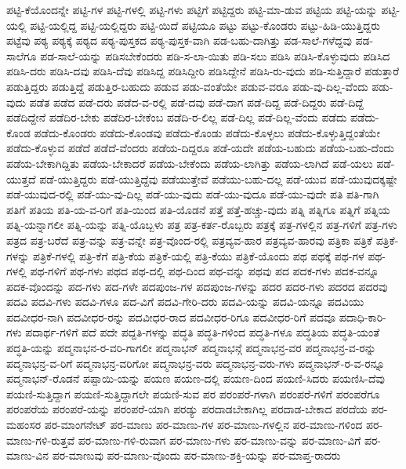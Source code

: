 {ಪಟ್ಟಿ-ಕೆಯೊಂದನ್ನೇ
ಪಟ್ಟಿ-ಗಳ
ಪಟ್ಟಿ-ಗಳಲ್ಲಿ
ಪಟ್ಟಿ-ಗಳು
ಪಟ್ಟಿಗೆ
ಪಟ್ಟಿದ್ದರು
ಪಟ್ಟಿ-ಮಾ-ಡುವ
ಪಟ್ಟಿಯ
ಪಟ್ಟಿ-ಯನ್ನು
ಪಟ್ಟಿ-ಯಲ್ಲಿ
ಪಟ್ಟಿ-ಯಲ್ಲಿದ್ದ
ಪಟ್ಟಿ-ಯಲ್ಲಿದ್ದರು
ಪಟ್ಟಿ-ಯಿದೆ
ಪಟ್ಟಿಯೂ
ಪಟ್ಟು
ಪಟ್ಟು-ಕೊಂಡರು
ಪಟ್ಟು-ಹಿಡಿ-ಯುತ್ತಿದ್ದರು
ಪಟ್ಟೆವು
ಪಠ್ಯ
ಪಠ್ಯಕ್ಕೆ
ಪಠ್ಯದ
ಪಠ್ಯ-ಪುಸ್ತಕದ
ಪಠ್ಯ-ಪುಸ್ತಕ-ವಾಗಿ
ಪಡ-ಬಹು-ದಾಗಿತ್ತು
ಪಡ-ಸಾಲೆ-ಗಳೆದ್ದವು
ಪಡ-ಸಾಲೆಗೂ
ಪಡ-ಸಾಲೆ-ಯನ್ನು
ಪಡಿಸಬೇಕೆಂದರು
ಪಡಿ-ಸ-ಲಾ-ಯಿತು
ಪಡಿ-ಸಲು
ಪಡಿಸಿ
ಪಡಿಸಿ-ಕೊಳ್ಳುವುದು
ಪಡಿಸಿದ
ಪಡಿಸಿ-ದರು
ಪಡಿಸಿ-ದವು
ಪಡಿಸಿ-ದೆವು
ಪಡಿಸಿದ್ದ
ಪಡಿಸಿದ್ದೀರಿ
ಪಡಿಸಿದ್ದೇನೆ
ಪಡಿಸಿ-ರು-ವುದು
ಪಡಿ-ಸುತ್ತಿದ್ದಾರೆ
ಪಡುತ್ತಾರೆ
ಪಡುತ್ತಿದ್ದರು
ಪಡುತ್ತಿದ್ದೆ
ಪಡುತ್ತಿರ-ಬಹುದು
ಪಡುವ
ಪಡು-ವಂತೆಯೇ
ಪಡುವ-ವರೂ
ಪಡು-ವು-ದಿಲ್ಲ-ವೆಂದು
ಪಡು-ವುದು
ಪಡೆತ
ಪಡೆದ
ಪಡೆ-ದರು
ಪಡೆದ-ವ-ರಲ್ಲಿ
ಪಡೆ-ದವು
ಪಡೆ-ದಾಗ
ಪಡೆ-ದಿದ್ದ
ಪಡೆ-ದಿದ್ದರು
ಪಡೆ-ದಿದ್ದೆ
ಪಡೆದಿದ್ದೇನೆ
ಪಡೆದಿರ-ಬೇಕು
ಪಡೆದಿರ-ಬೇಕೆಂಬ
ಪಡೆದಿ-ರ-ಲಿಲ್ಲ
ಪಡೆ-ದಿಲ್ಲ
ಪಡೆ-ದಿಲ್ಲ-ವೆಂದು
ಪಡೆದು
ಪಡೆದು-ಕೊಂಡ
ಪಡೆದು-ಕೊಂಡರು
ಪಡೆದು-ಕೊಂಡವು
ಪಡೆದು-ಕೊಂಡು
ಪಡೆದು-ಕೊಳ್ಳಲು
ಪಡೆದು-ಕೊಳ್ಳುತ್ತಿದ್ದಂತೆಯೇ
ಪಡೆದು-ಕೊಳ್ಳುವ
ಪಡೆದೆ
ಪಡೆದೆ-ವೆಂದರು
ಪಡೆಯ-ದಿದ್ದರೂ
ಪಡೆ-ಯದೇ
ಪಡೆಯ-ಬಹುದು
ಪಡೆಯ-ಬಹು-ದೆಂದು
ಪಡೆಯ-ಬೇಕಾಗಿದ್ದಿತು
ಪಡೆಯ-ಬೇಕಾದರೆ
ಪಡೆಯ-ಬೇಕೆಂದು
ಪಡೆಯ-ಲಾಗಿತ್ತು
ಪಡೆಯ-ಲಾಗಿದೆ
ಪಡೆ-ಯಲು
ಪಡೆ-ಯುತ್ತದೆ
ಪಡೆ-ಯುತ್ತಿದ್ದರು
ಪಡೆ-ಯುತ್ತಿದ್ದೆವು
ಪಡೆಯುತ್ತೇವೆ
ಪಡೆಯು-ಬಹು-ದಲ್ಲ
ಪಡೆ-ಯುವ
ಪಡೆ-ಯುವುದಕ್ಕಷ್ಟೇ
ಪಡೆ-ಯುವುದ-ರಲ್ಲಿ
ಪಡೆ-ಯು-ವು-ದಿಲ್ಲ
ಪಡೆ-ಯು-ವುದು
ಪಡೆ-ಯು-ವುದೂ
ಪಡೆ-ಯು-ವುದೇ
ಪತಿ
ಪತಿ-ಗಾಗಿ
ಪತಿಗೆ
ಪತಿಯ
ಪತಿ-ಯ-ವ-ರಿಗೆ
ಪತಿ-ಯಿಂದ
ಪತಿ-ಯೊಡನೆ
ಪತ್ತೆ
ಪತ್ತೆ-ಹಚ್ಚು-ವುದು
ಪತ್ನಿ
ಪತ್ನಿಗೂ
ಪತ್ನಿಗೆ
ಪತ್ನಿಯ
ಪತ್ನಿ-ಯನ್ನಾಗಲೀ
ಪತ್ನಿ-ಯನ್ನು
ಪತ್ನಿ-ಯೊಬ್ಬಳು
ಪತ್ರ
ಪತ್ರ-ಕರ್ತ-ರೊಬ್ಬರು
ಪತ್ರಕ್ಕೆ
ಪತ್ರ-ಗಳಲ್ಲಿನ
ಪತ್ರ-ಗಳಿಗೆ
ಪತ್ರ-ಗಳು
ಪತ್ರದ
ಪತ್ರ-ಬರೆದೆ
ಪತ್ರ-ವನ್ನು
ಪತ್ರ-ವನ್ನೇ
ಪತ್ರ-ವೊಂದ-ರಲ್ಲಿ
ಪತ್ರವ್ಯವ-ಹಾರ
ಪತ್ರವ್ಯವ-ಹಾರವು
ಪತ್ರಿಕಾ
ಪತ್ರಿಕೆ
ಪತ್ರಿಕೆ-ಗಳನ್ನು
ಪತ್ರಿಕೆ-ಗಳಲ್ಲಿ
ಪತ್ರಿ-ಕೆಗೆ
ಪತ್ರಿ-ಕೆಯ
ಪತ್ರಿಕೆ-ಯಲ್ಲಿ
ಪತ್ರಿ-ಕೆಯು
ಪತ್ರಿಕೆ-ಯೊಂದು
ಪಥ
ಪಥಕ್ಕೆ
ಪಥ-ಗಳ
ಪಥ-ಗಳಲ್ಲಿ
ಪಥ-ಗಳಿಗೆ
ಪಥ-ಗಳು
ಪಥದ
ಪಥ-ದಲ್ಲಿ
ಪಥ-ದಿಂದ
ಪಥ-ವನ್ನು
ಪಥವು
ಪದ
ಪದಕ-ಗಳು
ಪದಕ-ವನ್ನೂ
ಪದಕ-ವೊಂದನ್ನು
ಪದ-ಗಳು
ಪದ-ಗಳೇ
ಪದಪುಂಜ-ಗಳ
ಪದಪುಂಜ-ಗಳನ್ನು
ಪದರ
ಪದರ-ಗಳು
ಪದರದ
ಪದರವು
ಪದವಿ
ಪದವಿ-ಗಳು
ಪದವಿ-ಗಳೂ
ಪದ-ವಿಗೆ
ಪದವಿ-ಗೇರಿ-ದರು
ಪದವಿ-ಯನ್ನು
ಪದವಿ-ಯನ್ನೂ
ಪದವಿಯು
ಪದವೀಧರ-ನಾಗಿ
ಪದವೀಧರ-ರನ್ನು
ಪದವೀಧರ-ರಾದ
ಪದವೀಧರ-ರಿಗೂ
ಪದವೀಧರ-ರಿಗೆ
ಪದವೂ
ಪದಾಧಿ-ಕಾರಿ-ಗಳು
ಪದಾರ್ಥ-ಗಳಿಗೆ
ಪದೆ
ಪದೇ
ಪದ್ದತಿ-ಗಳನ್ನು
ಪದ್ಧತಿ
ಪದ್ಧತಿ-ಗಳಿಂದ
ಪದ್ಧತಿ-ಗಳೂ
ಪದ್ಧತಿಯ
ಪದ್ಧತಿ-ಯಂತೆ
ಪದ್ಧತಿ-ಯನ್ನು
ಪದ್ಮನಾಭನ-ರ-ವರಿ-ಗಾಗಲೀ
ಪದ್ಮನಾಭನ್
ಪದ್ಮನಾಭನ್ಗೆ
ಪದ್ಮನಾಭನ್ರ-ವರ
ಪದ್ಮನಾಭನ್ರ-ವ-ರನ್ನು
ಪದ್ಮನಾಭನ್ರ-ವ-ರಿಗೆ
ಪದ್ಮನಾಭನ್ರ-ವರಿಗೋ
ಪದ್ಮನಾಭನ್ರ-ವರು
ಪದ್ಮನಾಭನ್ರ-ವರು-ಗಳು
ಪದ್ಮನಾಭನ್-ರ-ವ-ರನ್ನೂ
ಪದ್ಮನಾಭನ್-ರೊಡನೆ
ಪಪ್ಪಾಯಿ-ಯನ್ನು
ಪಯಣ
ಪಯಣ-ದಲ್ಲಿ
ಪಯಣ-ದಿಂದ
ಪಯಣಿ-ಸಿದರು
ಪಯಣಿಸಿ-ದೆವು
ಪಯಣಿ-ಸುತ್ತಿದ್ದಾಗ
ಪಯಣಿ-ಸುತ್ತಿದ್ದಾಗಲೇ
ಪಯಣಿ-ಸುವ
ಪರ
ಪರಂಪರೆ-ಗಳಾಗಿ
ಪರಂಪರೆ-ಗಳಿಗೆ
ಪರಂಪರೆಗೂ
ಪರಂಪರೆಯ
ಪರಂಪರೆ-ಯನ್ನು
ಪರಂಪರೆ-ಯಾಗಿ
ಪರಡ್ಯು
ಪರದಾಡಬೇಕಾಗಿಲ್ಲ
ಪರದಾಡ-ಬೇಕಾದ
ಪರದೆಯ
ಪರ-ಮಹಂಸರ
ಪರ-ಮಾಂಗನೇಟ್
ಪರ-ಮಾಣು
ಪರ-ಮಾಣು-ಗಳ
ಪರ-ಮಾಣು-ಗಳಲ್ಲಿನ
ಪರ-ಮಾಣು-ಗಳಿಂದ
ಪರ-ಮಾಣು-ಗಳಿ-ರುತ್ತವೆ
ಪರ-ಮಾಣು-ಗಳಿ-ರುವಾಗ
ಪರ-ಮಾಣು-ಗಳು
ಪರ-ಮಾಣು-ವನ್ನು
ಪರ-ಮಾಣು-ವಿಗೆ
ಪರ-ಮಾಣು-ವಿನ
ಪರ-ಮಾಣುವು
ಪರ-ಮಾಣು-ವೊಂದು
ಪರ-ಮಾಣು-ಶಕ್ತಿ-ಯನ್ನು
ಪರ-ಮಾಪ್ತ-ರಾದರು
}
